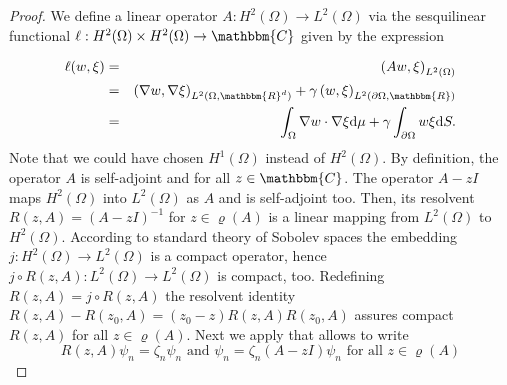 \documentclass[a4paper,11pt]{article}
\theoremstyle{plain} %
\theoremstyle{definition} %
\theoremstyle{remark} %
\theoremstyle{remark}
\begin{document}
\begin{proof}%
We define a linear operator $ A : H^2(\Omega ) \rightarrow L^2(\Omega ) $ via the sesquilinear functional $\ell : H^2(\Omega ) \times H^2(\Omega ) \rightarrow \mathbbm{C}$ given by the expression

%
\begin{eqnarray}
\ell (w, \xi ) & = & \left( A w, \xi \right)_{L^2(\Omega ) } \label{ell_func_1}\\
& = & \left( \nabla w, \nabla \xi \right)_{L^2(\Omega ,\mathbbm{R}^d ) } + \gamma \left( w, \xi \right)_{L^2(\partial \Omega ,\mathbbm{R} ) } \label{ell_func_2}\\
& = & \int_\Omega \nabla w \cdot \nabla \xi  \mathrm{d}\mu + \gamma \int_{\partial \Omega } w \xi \mathrm{d} S .
\end{eqnarray}
Note that we could have chosen $H^1(\Omega ) $ instead of $H^2(\Omega ) $. By definition, the operator $A$ is self-adjoint and for all $ z \in \mathbbm{C} $. The operator $ A -z I $ maps $ H^2(\Omega ) $ into $ L^2(\Omega ) $ as $A$ and is self-adjoint too. Then, its resolvent $R(z,A ) = (A -z I )^{-1} $ for $ z \in \varrho (A) $ is a linear mapping from $ L^2(\Omega ) $ to  $H^2(\Omega )$. According to standard theory of Sobolev spaces the embedding $j: H^2(\Omega ) \rightarrow L^2(\Omega ) $ is a compact operator, hence $ j \circ R(z,A ) : L^2(\Omega ) \rightarrow L^2(\Omega ) $ is compact, too. Redefining $ R(z,A )= j \circ R(z,A ) $ the resolvent identity $R(z,A ) - R(z_0,A ) = (z_0 - z) R(z,A ) R(z_0,A )$ assures compact $ R(z,A) $ for all $ z \in \varrho (A) $. Next we apply \cite[Theorem 15.12, p 137]{meinhold1990pdg} that allows to write
\begin{equation*}
R(z,A )\psi_n = \zeta_n \psi_n \text{ and } \psi_n = \zeta_n (A - zI) \psi_n \text{ for all } z \in \varrho (A)
\end{equation*}

\end{proof}
\end{document}

